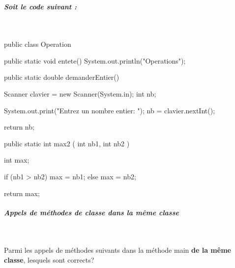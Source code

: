 \documentclass[11pt,a4paper]{article}
\begin{document}
		\subparagraph{Soit le code suivant :  } 
		
					\textcolor{white}{.} \par
				\begin{Java}
public class Operation {

	public static void entete() {
		System.out.println("Operations");
	}
  
	public static double demanderEntier() {  
	
		Scanner clavier = new Scanner(System.in);
		int nb;
		
		System.out.print("Entrez un nombre entier: ");
		nb = clavier.nextInt();
		
		return nb;  
	}  
	
	public static int max2 ( int nb1, int nb2 ) { 
	 
		int max;
		
		if (nb1 > nb2) {
			max = nb1;
		} else {
			max = nb2;
		}
		
		return max;  
	}   
	 
}				\end{Java}
            \par
        
			
		\subparagraph{Appels de m\'ethodes de classe dans la m\^eme classe} 
		
                \textcolor{white}{.} \par
            
              Parmi les appels de m\'ethodes suivants dans la m\'ethode main \textbf{de la m\^eme classe},  lesquels sont corrects?  
            
\end{document}
